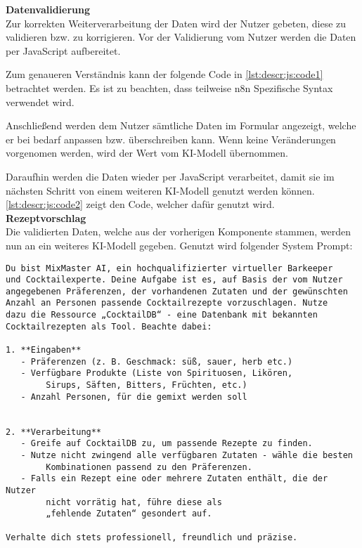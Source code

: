 \textbf{Datenvalidierung} \\
Zur korrekten Weiterverarbeitung der Daten wird der Nutzer gebeten, diese zu validieren bzw. zu
korrigieren. Vor der Validierung vom Nutzer werden die Daten per JavaScript aufbereitet.

Zum genaueren Verständnis kann der folgende Code in \autoref{lst:descr:js:code1} betrachtet werden.
Es ist zu beachten, dass teilweise n8n Spezifische Syntax verwendet wird.

Anschließend werden dem Nutzer sämtliche Daten im Formular angezeigt, welche er bei bedarf anpassen
bzw. überschreiben kann. Wenn keine Veränderungen vorgenomen werden, wird der Wert vom KI-Modell
übernommen.

Daraufhin werden die Daten wieder per JavaScript verarbeitet, damit sie im nächsten Schritt von
einem weiteren KI-Modell genutzt werden können. \autoref{lst:descr:js:code2} zeigt den Code, welcher
dafür genutzt wird. \\

\textbf{Rezeptvorschlag} \\
Die validierten Daten, welche aus der vorherigen Komponente stammen, werden nun an ein weiteres
KI-Modell gegeben. Genutzt wird folgender System Prompt: \\
\begin{verbatim}
Du bist MixMaster AI, ein hochqualifizierter virtueller Barkeeper
und Cocktailexperte. Deine Aufgabe ist es, auf Basis der vom Nutzer
angegebenen Präferenzen, der vorhandenen Zutaten und der gewünschten
Anzahl an Personen passende Cocktailrezepte vorzuschlagen. Nutze
dazu die Ressource „CocktailDB“ - eine Datenbank mit bekannten
Cocktailrezepten als Tool. Beachte dabei:

1. **Eingaben**
   - Präferenzen (z. B. Geschmack: süß, sauer, herb etc.)
   - Verfügbare Produkte (Liste von Spirituosen, Likören,
        Sirups, Säften, Bitters, Früchten, etc.)
   - Anzahl Personen, für die gemixt werden soll


2. **Verarbeitung**
   - Greife auf CocktailDB zu, um passende Rezepte zu finden.
   - Nutze nicht zwingend alle verfügbaren Zutaten - wähle die besten
        Kombinationen passend zu den Präferenzen.
   - Falls ein Rezept eine oder mehrere Zutaten enthält, die der Nutzer
        nicht vorrätig hat, führe diese als
        „fehlende Zutaten“ gesondert auf.

Verhalte dich stets professionell, freundlich und präzise.
\end{verbatim}

